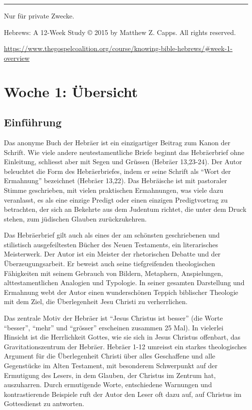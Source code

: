 \documentclass[
  12pt,
]{krantz}
\begin{document}
\begin{center}\rule{0.5\linewidth}{0.5pt}\end{center}

Nur für private Zwecke.

Hebrews: A 12-Week Study © 2015 by Matthew Z. Capps. All rights reserved.

\url{https://www.thegospelcoalition.org/course/knowing-bible-hebrews/\#week-1-overview}

\hypertarget{woche01}{%
\chapter{Woche 1: Übersicht}\label{woche01}}

\hypertarget{einfuxfchrung}{%
\section{Einführung}\label{einfuxfchrung}}

Das anonyme Buch der Hebräer ist ein einzigartiger Beitrag zum Kanon der Schrift. Wie viele andere neutestamentliche Briefe beginnt das Hebräerbrief ohne Einleitung, schliesst aber mit Segen und Grüssen ({Hebräer 13,23-24}). Der Autor beleuchtet die Form des Hebräerbriefes, indem er seine Schrift als ``Wort der Ermahnung'' bezeichnet ({Hebräer 13,22}). Das Hebräische ist mit pastoraler Stimme geschrieben, mit vielen praktischen Ermahnungen, was viele dazu veranlasst, es als eine einzige Predigt oder einen einzigen Predigtvortrag zu betrachten, der sich an Bekehrte aus dem Judentum richtet, die unter dem Druck stehen, zum jüdischen Glauben zurückzukehren.

Das Hebräerbrief gilt auch als eines der am schönsten geschriebenen und stilistisch ausgefeiltesten Bücher des Neuen Testaments, ein literarisches Meisterwerk. Der Autor ist ein Meister der rhetorischen Debatte und der Überzeugungsarbeit. Er beweist auch seine tiefgreifenden theologischen Fähigkeiten mit seinem Gebrauch von Bildern, Metaphern, Anspielungen, alttestamentlichen Analogien und Typologie. In seiner gesamten Darstellung und Ermahnung webt der Autor einen wunderschönen Teppich biblischer Theologie mit dem Ziel, die Überlegenheit Jesu Christi zu verherrlichen.

Das zentrale Motiv der Hebräer ist ``Jesus Christus ist besser'' (die Worte ``besser'', ``mehr'' und ``grösser'' erscheinen zusammen 25 Mal). In vielerlei Hinsicht ist die Herrlichkeit Gottes, wie sie sich in Jesus Christus offenbart, das Gravitationszentrum der Hebräer. Hebräer 1-12 umreisst ein starkes theologisches Argument für die Überlegenheit Christi über alles Geschaffene und alle Gegenstücke im Alten Testament, mit besonderem Schwerpunkt auf der Ermutigung des Lesers, in dem Glauben, der Christus im Zentrum hat, auszuharren. Durch ermutigende Worte, entschiedene Warnungen und kontrastierende Beispiele ruft der Autor den Leser oft dazu auf, auf Christus im Gottesdienst zu antworten.
\end{document}
